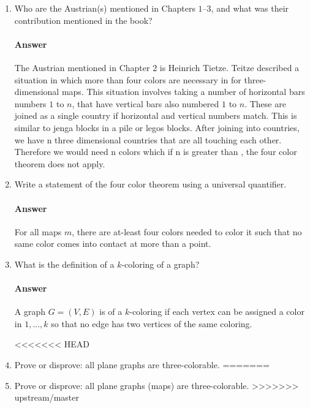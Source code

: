 \documentclass{article}
\begin{document}
\begin{enumerate}

    \item Who are the Austrian(s) mentioned in Chapters $1$--$3$, and what was
    their contribution mentioned in the book?

        \paragraph{Answer}
        The Austrian mentioned in Chapter $2$ is Heinrich Tietze. Teitze
        described a situation in which more than four colors are necessary in
        for three-dimensional maps. This situation involves taking a number of
        horizontal bars numbers $1$ to $n$, that have vertical bars also
        numbered $1$ to $n$. These are joined as a single country  if horizontal
        and vertical numbers match.
        This is similar to jenga blocks in a pile or legos blocks.
        After joining into countries, we have n three dimensional countries
         that are all touching each other.
        Therefore we would need n colors which if n is greater than ,
        the four color theorem does not apply.

    \item Write a statement of the four color theorem using a universal
        quantifier.

        \paragraph{Answer}
        For all maps $m$, there are at-least four colors needed to color it such
        that no same color comes into contact at more than a point.

    \item What is the definition of a $k$-coloring of a graph?

        \paragraph{Answer}
        A graph $G  = (V,E)$ is of a $k$-coloring if each vertex can be assigned
         a color in ${1,...,k}$ so that no edge has two vertices of the same
         coloring.

<<<<<<< HEAD
    \item Prove or disprove: all plane graphs are three-colorable.
=======
    \item Prove or disprove: all plane graphs (maps) are three-colorable.
>>>>>>> upstream/master


\end{enumerate}
\end{document}
